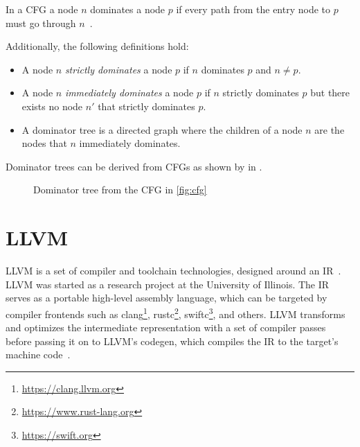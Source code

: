 In a \gls{CFG} a node $n$ dominates a node $p$ if every path from the entry node to $p$ must go through $n$~\parencite{10.1145/1460299.1460314}.

Additionally, the following definitions hold:
\begin{itemize}
    \item A node $n$ \textit{strictly dominates} a node $p$ if $n$ dominates $p$ and $n \neq p$.
    \item A node $n$ \textit{immediately dominates} a node $p$ if $n$ strictly dominates $p$ but there exists no node $n'$ that strictly dominates $p$.
    \item A dominator tree is a directed graph where the children of a node $n$ are the nodes that $n$ immediately dominates.
\end{itemize}

Dominator trees can be derived from \gls{CFG}s as shown by \citeauthor{10.1145/362835.362838} in \cite{10.1145/362835.362838}.

\begin{figure}[htpb]
    \centering
    \label{fig:dominator-tree}
    \caption{Dominator tree from the \gls{CFG} in \cref{fig:cfg}}
\end{figure}


\section{LLVM}\label{sec:llvm}

LLVM is a set of compiler and toolchain technologies, designed around an \gls{IR}~\parencite{llvm}.
LLVM was started as a research project at the University of Illinois.
The \gls{IR} serves as a portable high-level assembly language, which can be targeted by compiler frontends such as clang\footnote{\url{https://clang.llvm.org}}, rustc\footnote{\url{https://www.rust-lang.org}}, swiftc\footnote{\url{https://swift.org}}, and others.
LLVM transforms and optimizes the intermediate representation with a set of compiler passes before passing it on to LLVM's codegen, which compiles the IR to the target's machine code~\parencite{LLVM_CGO04}.

